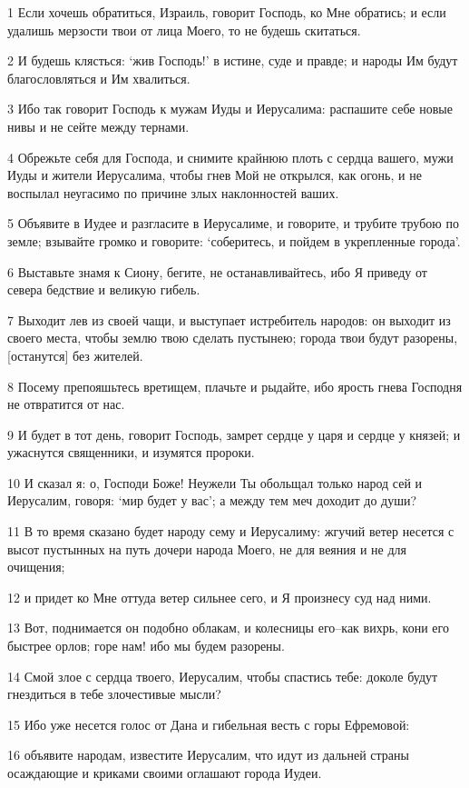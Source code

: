 \par 1 Если хочешь обратиться, Израиль, говорит Господь, ко Мне обратись; и если удалишь мерзости твои от лица Моего, то не будешь скитаться.
\par 2 И будешь клясться: `жив Господь!' в истине, суде и правде; и народы Им будут благословляться и Им хвалиться.
\par 3 Ибо так говорит Господь к мужам Иуды и Иерусалима: распашите себе новые нивы и не сейте между тернами.
\par 4 Обрежьте себя для Господа, и снимите крайнюю плоть с сердца вашего, мужи Иуды и жители Иерусалима, чтобы гнев Мой не открылся, как огонь, и не воспылал неугасимо по причине злых наклонностей ваших.
\par 5 Объявите в Иудее и разгласите в Иерусалиме, и говорите, и трубите трубою по земле; взывайте громко и говорите: `соберитесь, и пойдем в укрепленные города'.
\par 6 Выставьте знамя к Сиону, бегите, не останавливайтесь, ибо Я приведу от севера бедствие и великую гибель.
\par 7 Выходит лев из своей чащи, и выступает истребитель народов: он выходит из своего места, чтобы землю твою сделать пустынею; города твои будут разорены, [останутся] без жителей.
\par 8 Посему препояшьтесь вретищем, плачьте и рыдайте, ибо ярость гнева Господня не отвратится от нас.
\par 9 И будет в тот день, говорит Господь, замрет сердце у царя и сердце у князей; и ужаснутся священники, и изумятся пророки.
\par 10 И сказал я: о, Господи Боже! Неужели Ты обольщал только народ сей и Иерусалим, говоря: `мир будет у вас'; а между тем меч доходит до души?
\par 11 В то время сказано будет народу сему и Иерусалиму: жгучий ветер несется с высот пустынных на путь дочери народа Моего, не для веяния и не для очищения;
\par 12 и придет ко Мне оттуда ветер сильнее сего, и Я произнесу суд над ними.
\par 13 Вот, поднимается он подобно облакам, и колесницы его--как вихрь, кони его быстрее орлов; горе нам! ибо мы будем разорены.
\par 14 Смой злое с сердца твоего, Иерусалим, чтобы спастись тебе: доколе будут гнездиться в тебе злочестивые мысли?
\par 15 Ибо уже несется голос от Дана и гибельная весть с горы Ефремовой:
\par 16 объявите народам, известите Иерусалим, что идут из дальней страны осаждающие и криками своими оглашают города Иудеи.
